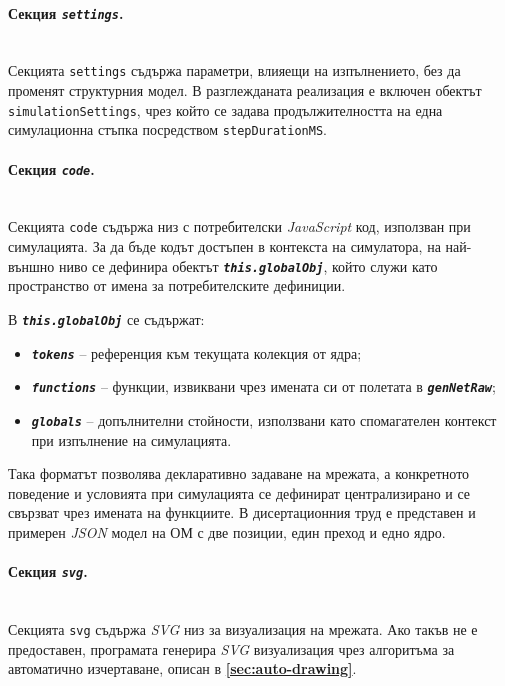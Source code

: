 \paragraph{Секция \textit{\texttt{settings}}.}\mbox{}\\
Секцията \texttt{settings} съдържа параметри, влияещи на изпълнението, без да променят структурния модел. В разглежданата реализация е включен обектът \texttt{simulationSettings}, чрез който се задава продължителността на една симулационна стъпка посредством \texttt{stepDurationMS}.

\paragraph{Секция \textit{\texttt{code}}.}\mbox{}\\
Секцията \texttt{code} съдържа низ с потребителски \textit{JavaScript} код, използван при симулацията. За да бъде кодът достъпен в контекста на симулатора, на най-външно ниво се дефинира обектът \texttt{\textbf{\textit{this.globalObj}}}, който служи като пространство от имена за потребителските дефиниции.

\hspace*{2.5em}В \texttt{\textbf{\textit{this.globalObj}}} се съдържат:
\begin{itemize}
\item \texttt{\textbf{\textit{tokens}}} -- референция към текущата колекция от ядра;
\item \texttt{\textbf{\textit{functions}}} -- функции, извиквани чрез имената си от полетата в \texttt{\textbf{\textit{genNetRaw}}};
\item \texttt{\textbf{\textit{globals}}} -- допълнителни стойности, използвани като спомагателен контекст при изпълнение на симулацията.
\end{itemize}

Така форматът позволява декларативно задаване на мрежата, а конкретното поведение и условията при симулацията се дефинират централизирано и се свързват чрез имената на функциите. В дисертационния труд е представен и примерен \textit{JSON} модел на ОМ с две позиции, един преход и едно ядро.

\paragraph{Секция \textit{\texttt{svg}}.}\mbox{}\\
Секцията \texttt{svg} съдържа \textit{SVG} низ за визуализация на мрежата. Ако такъв не е предоставен, програмата генерира \textit{SVG} визуализация чрез алгоритъма за автоматично изчертаване, описан в \textbf{\ref{sec:auto-drawing}}.

